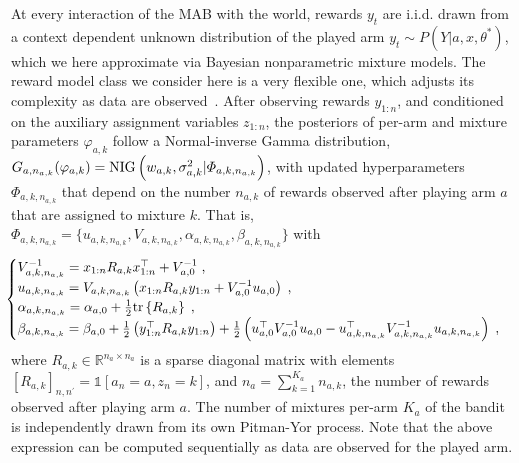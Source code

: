\documentclass{article}
\def \Real{{\mathbb R}}
\newcommand{\thetastar}{\theta^*}
\newcommand{\iid}{i.i.d. }
\newcommand{\NIG}[1]{{\rm NIG}\left( #1\right)}
\newcommand{\tr}[1]{\mathrm{tr}\left\{ #1 \right\}} %
\begin{document}
At every interaction of the MAB with the world, rewards $y_t$ are \iid drawn from a context dependent unknown distribution of the played arm $y_{t}\sim P(Y|a,x,\thetastar)$, which we here approximate via Bayesian nonparametric mixture models. The reward model class we consider here is a very flexible one, which adjusts its complexity as data are observed~\cite{b-Ghosal2017}.
After observing rewards $y_{1:n}$, and conditioned on the auxiliary assignment variables $z_{1:n}$, the posteriors of per-arm and mixture parameters $\varphi_{a,k}$ follow a Normal-inverse Gamma distribution, $G_{a,n_{a,k}}(\varphi_{a,k})=\NIG{w_{a,k}, \sigma_{a,k}^2 |\varPhi_{a,k,n_{a,k}}}$, with updated hyperparameters $\varPhi_{a,k,n_{a,k}}$ that depend on the number $n_{a,k}$ of rewards observed after playing arm $a$ that are assigned to mixture $k$. That is, $\varPhi_{a,k,n_{a,k}}=\{u_{a,k,n_{a,k}}, V_{a,k,n_{a,k}},\alpha_{a,k,n_{a,k}}, \beta_{a,k,n_{a,k}} \}$ with
\begin{equation}
\hspace*{-1ex}\begin{cases}
V_{a,k,n_{a,k}}^{-1} = x_{1:n} R_{a,k} x_{1:n}^\top + V_{a,0}^{-1} \;,\\
u_{a,k,n_{a,k}}= V_{a,k,n_{a,k}} \left( x_{1:n} R_{a,k} y_{1:n} + V_{a,0}^{-1} u_{a,0}\right) \;, \\
\alpha_{a,k,n_{a,k}} = \alpha_{a,0} + \frac{1}{2} \tr{R_{a,k}} \;, \\
\beta_{a,k,n_{a,k}} = \beta_{a,0} + \frac{1}{2}\left(y_{1:n}^\top R_{a,k}y_{1:n} \right) + \frac{1}{2}\left( u_{a,0}^\top V_{a,0}^{-1} u_{a,0} - u_{a,k,n_{a,k}}^\top V_{a,k,n_{a,k}}^{-1} u_{a,k,n_{a,k}} \right) \; ,
\end{cases}
\label{eq:posterior_hyperparameters}
\end{equation}
where $R_{a,k}\in\Real^{n_a\times n_a}$ is a sparse diagonal matrix with elements $\left[R_{a,k}\right]_{n,n^\prime}=\mathds{1}[a_n=a,z_n=k]$, and $n_{a}=\sum_{k=1}^{K_a} n_{a,k}$, the number of rewards observed after playing arm $a$. The number of mixtures per-arm $K_a$ of the bandit is independently drawn from its own Pitman-Yor process. Note that the above expression can be computed sequentially as data are observed for the played arm.
\end{document}
